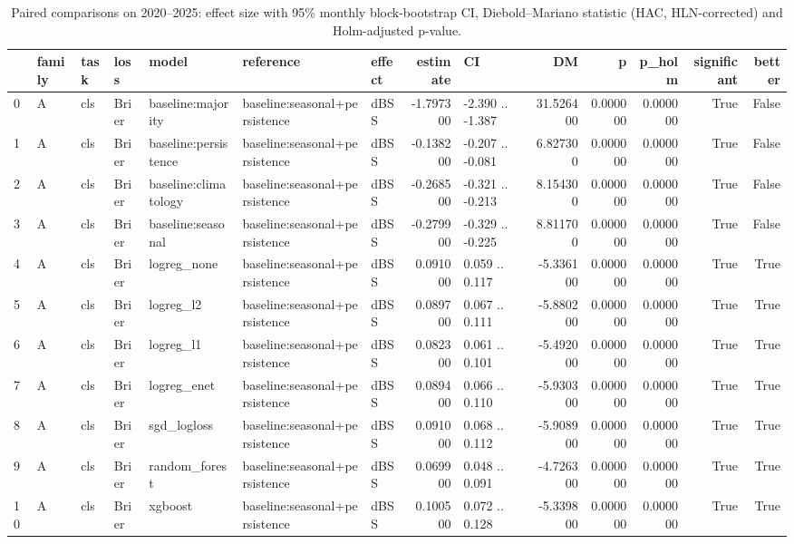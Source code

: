 \begin{table}
\caption{Paired comparisons on 2020--2025: effect size with 95\% monthly block-bootstrap CI, Diebold--Mariano statistic (HAC, HLN-corrected) and Holm-adjusted p-value.}
\label{tab:test_dm}
\begin{tabular}{lllllllrlrrrrr}
\toprule
 & family & task & loss & model & reference & effect & estimate & CI & DM & p & p\_holm & significant & better \\
\midrule
0 & A & cls & Brier & baseline:majority & baseline:seasonal+persistence & dBSS & -1.797300 & -2.390 .. -1.387 & 31.526400 & 0.000000 & 0.000000 & True & False \\
1 & A & cls & Brier & baseline:persistence & baseline:seasonal+persistence & dBSS & -0.138200 & -0.207 .. -0.081 & 6.827300 & 0.000000 & 0.000000 & True & False \\
2 & A & cls & Brier & baseline:climatology & baseline:seasonal+persistence & dBSS & -0.268500 & -0.321 .. -0.213 & 8.154300 & 0.000000 & 0.000000 & True & False \\
3 & A & cls & Brier & baseline:seasonal & baseline:seasonal+persistence & dBSS & -0.279900 & -0.329 .. -0.225 & 8.811700 & 0.000000 & 0.000000 & True & False \\
4 & A & cls & Brier & logreg\_none & baseline:seasonal+persistence & dBSS & 0.091000 & 0.059 .. 0.117 & -5.336100 & 0.000000 & 0.000000 & True & True \\
5 & A & cls & Brier & logreg\_l2 & baseline:seasonal+persistence & dBSS & 0.089700 & 0.067 .. 0.111 & -5.880200 & 0.000000 & 0.000000 & True & True \\
6 & A & cls & Brier & logreg\_l1 & baseline:seasonal+persistence & dBSS & 0.082300 & 0.061 .. 0.101 & -5.492000 & 0.000000 & 0.000000 & True & True \\
7 & A & cls & Brier & logreg\_enet & baseline:seasonal+persistence & dBSS & 0.089400 & 0.066 .. 0.110 & -5.930300 & 0.000000 & 0.000000 & True & True \\
8 & A & cls & Brier & sgd\_logloss & baseline:seasonal+persistence & dBSS & 0.091000 & 0.068 .. 0.112 & -5.908900 & 0.000000 & 0.000000 & True & True \\
9 & A & cls & Brier & random\_forest & baseline:seasonal+persistence & dBSS & 0.069900 & 0.048 .. 0.091 & -4.726300 & 0.000000 & 0.000000 & True & True \\
10 & A & cls & Brier & xgboost & baseline:seasonal+persistence & dBSS & 0.100500 & 0.072 .. 0.128 & -5.339800 & 0.000000 & 0.000000 & True & True \\

\end{tabular}
\end{table}
